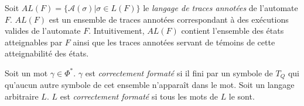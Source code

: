 Soit $AL(F)=\{\mathcal{A}(\sigma)|\sigma \in L(F)\}$ le \emph{langage de traces annotées} de l'automate $F$. $AL(F)$ est un ensemble de traces annotées correspondant à des exécutions valides de l'automate $F$. Intuitivement, $AL(F)$ contient l'ensemble des états atteignables par $F$ ainsi que les traces annotées servant de témoins de cette atteignabilité des états.


Soit un mot $\gamma \in \Phi^*$. $\gamma$ est \emph{correctement formaté} si il fini par un symbole de $T_Q$ qui qu'aucun autre symbole de cet ensemble n'apparaît dans le mot. Soit un langage arbitraire $L$. $L$ est \emph{correctement formaté} si tous les mots de $L$ le sont.
